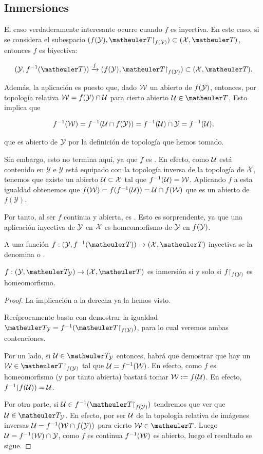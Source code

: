 \subsection{Inmersiones}
El caso verdaderamente interesante ocurre cuando $f$ es inyectiva. En este caso, si se considera el subespacio $(f(\mathcal{\Y}),\T\restriction_{f(\mathcal{\Y})}) \subset (\mathcal{\X},\T)$, entonces $f$ es biyectiva:

\[(\mathcal{\Y},f^{-1}(\T)) \xrightarrow{f} (f(\mathcal{\Y}),\T\restriction_{f(\mathcal{\Y})}) \subset (\mathcal{\X},\T).\]

Además, la aplicación es  puesto que, dado $\mathcal{W}$ un abierto de $f(\mathcal{\mathcal{Y}})$, entonces, por topología relativa $\mathcal{W}=f(\mathcal{Y})\cap \mathcal{U}$ para cierto abierto $\U\in \T$. Esto implica que

\[f^{-1}(\mathcal{W})=f^{-1}(\mathcal{U}\cap f(\mathcal{\mathcal{Y}}))=f^{-1}(\mathcal{U})\cap \mathcal{\mathcal{Y}}=f^{-1}(\mathcal{U}),\]

que es abierto de $\mathcal{\mathcal{Y}}$ por la definición de topología que hemos tomado.

Sin embargo, esto no termina aquí, ya que $f$ es . En efecto, como $\mathcal{U}$ está contenido en $\mathcal{Y}$ e $\mathcal{Y}$ está equipado con la topología inversa de la topología de $\mathcal{X}$, tenemos que existe un abierto $\mathcal{U} \subset \mathcal{X}$ tal que $f^{-1}(\mathcal{U}) = \mathcal{W}$. Aplicando $f$ a esta igualdad obtenemos que $f(\mathcal{W}) = f(f^{-1}(\mathcal{U})) = \mathcal{U} \cap f(\mathcal{W})$ que es un abierto de $f(\mathcal{Y})$.

Por tanto, al ser $f$ continua y abierta, es . Esto es sorprendente, ya que una aplicación inyectiva de $\mathcal{\mathcal{Y}}$ en $\mathcal{\mathcal{X}}$ es homeomorfismo de $\mathcal{\mathcal{Y}}$ en $f(\mathcal{\mathcal{Y}})$.

\begin{defi}
	A una función $f:(\Y,f^{-1}(\T))\to(\X,\T)$ inyectiva se la denomina  o .
\end{defi}
\begin{prop}[Caracterización]
	$f:(\Y,\T_\Y)\to(\X,\T)$ es inmersión si y solo si $f\mathord{\upharpoonright}_{f(\mathcal{Y})}$ es homeomorfismo.
\end{prop}
\begin{proof}
	La implicación a la derecha ya la hemos visto.
	
	Recíprocamente basta con demostrar la igualdad $\T_\Y=f^{-1}(\T\restriction_{f(\Y)})$, para lo cual veremos ambas contenciones.
	
	Por un lado, si $\U\in\T_\Y$ entonces, habrá que demostrar que hay un $\W\in\T\restriction_{f(\Y)}$ tal que $\mathcal{U}=f^{-1}(\mathcal{W})$. En efecto, como $f$ es homeomorfismo (y por tanto abierta) bastará tomar $\mathcal{W}:=f(\mathcal{U})$. En efecto, $f^{-1}(f(\mathcal{U}))=\mathcal{U}$.
	
	Por otra parte, si $\U\in f^{-1}(\T\restriction_{f(\Y)})$ tendremos que ver que $\U\in \T_\Y$. En efecto, por ser $\mathcal{U}$ de la topología relativa de imágenes inversas $\mathcal{U}=f^{-1}(\mathcal{W}\cap f(\mathcal{Y}))$ para cierto $\W\in \T$. Luego $\mathcal{U}=f^{-1}(\mathcal{W})\cap \mathcal{Y}$, como $f$ es continua $f^{-1}(\mathcal{W})$ es abierto, luego el resultado se sigue.
\end{proof}
